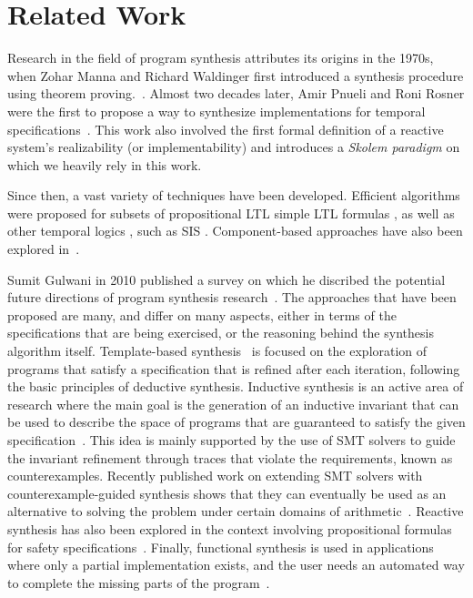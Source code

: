 \section{Related Work}

Research in the field of program synthesis attributes its origins in the 1970s,
when Zohar Manna and Richard Waldinger first introduced a synthesis procedure
using theorem proving.~\cite{manna1971toward}. Almost two decades later, Amir
Pnueli and Roni Rosner were the first to propose a way to synthesize
implementations for temporal specifications~\cite{DBLP:conf/popl/PnueliR89}. This work also
involved the first formal definition of a reactive system's realizability (or implementability) and
introduces a \emph{Skolem paradigm} on which we heavily rely in this work.


Since then, a vast variety of techniques have been developed. Efficient
algorithms were proposed for subsets of propositional LTL
\cite{Klein10,tomita2016safraless,ehlers2010symbolic,cheng2016structural} simple
LTL formulas \cite{Bohy12,hagihara2016simple,Tini03}, as well as other temporal
logics \cite{benevs2012factorization,monmege2016real,Hamza10}, such as SIS \cite{Aziz95}.
Component-based approaches have also been explored in~\cite{Chatterjee07,dammyou}.

Sumit Gulwani in 2010 published a survey on which he discribed the
potential future directions of program synthesis research~\cite{gulwani2010dimensions}.
The approaches that have been proposed are many, and differ on many aspects,
either in terms of the specifications that are being exercised, or the reasoning
behind the synthesis algorithm itself. Template-based
synthesis~\cite{srivastava2013template} is focused on the exploration of
programs that satisfy a specification that is refined after each
iteration, following the basic principles of deductive synthesis. Inductive
synthesis is an active area of research where the main goal
is the generation of an inductive invariant that can be used to describe the
space of programs that are guaranteed to satisfy the given
specification~\cite{flener2001inductive}.
This idea is mainly supported by the use of SMT solvers to guide the invariant
refinement through traces that violate the requirements, known as
counterexamples. Recently published work on extending SMT solvers with
counterexample-guided synthesis shows that they can eventually be
used as an alternative to solving the problem under certain domains of
arithmetic~\cite{reynoldscounterexample}. Reactive synthesis has also
been explored in the context involving propositional formulas for safety
specifications~\cite{bloem2016satisfiability}. Finally, functional synthesis is
used in applications where only a partial implementation exists, and the user needs an automated way to complete the missing parts of the program~\cite{kneuss2013integrating}.

